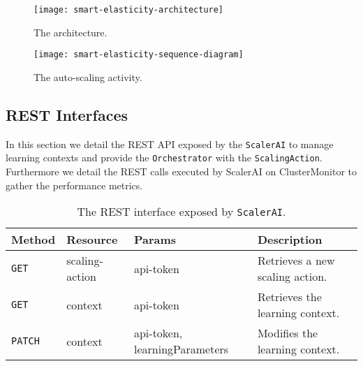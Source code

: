 \begin{figure}	
	\label{fig:smart-elasticity-architecture}
	\centering
	\texttt{[image: smart-elasticity-architecture]}
	\caption{The architecture.}
\end{figure}
\clearpage
\vfill
\begin{landscape}
	\begin{figure}	
		\label{fig:smart-elasticity-sequence-diagram}
		\centering
		\texttt{[image: smart-elasticity-sequence-diagram]}
		\caption{The auto-scaling activity.}
	\end{figure}
\end{landscape}
\vfill
\clearpage


\subsection{REST Interfaces}
\label{sec:smart-elasticity-implementation-rest-interfaces}

In this section we detail the REST API exposed by the \texttt{ScalerAI} to manage learning contexts and provide the \texttt{Orchestrator} with the \texttt{ScalingAction}. 
%
Furthermore we detail the REST calls executed by ScalerAI on ClusterMonitor to gather the performance metrics.

\begin{table}
	\label{tbl:smart-elasticity-rest-scalerai}
	\centering
	\begin{tabular}{| m{1.5cm} | m{3cm} | m{3cm} | m{8cm} | }\hline
		
		\textbf{Method} & \textbf{Resource} & \textbf{Params} & \textbf{Description} \\\hline

		\texttt{GET}	& scaling-action  & api-token & Retrieves a new scaling action. \\\hline

		\texttt{GET}    & context         & api-token & Retrieves the learning context. \\\hline
		
		\texttt{PATCH}  & context         & api-token, learningParameters & Modifies the learning context. \\\hline
		
	\end{tabular}
	\caption{The REST interface exposed by \texttt{ScalerAI}.}
\end{table}

